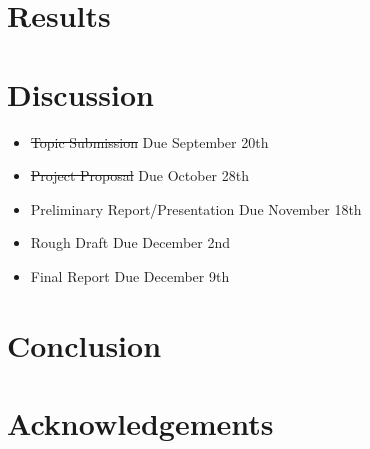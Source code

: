 \documentclass[letterpaper, 10pt, titlepage, twocolumn]{article}
\begin{document}
\section*{Results}


\section*{Discussion}
\begin{itemize}
  \item \normalsize \st{Topic Submission} \footnotesize Due September 20th
  \item \normalsize \st{Project Proposal} \footnotesize Due October 28th
  \item \normalsize Preliminary Report/Presentation \footnotesize Due November 18th
  \item \normalsize Rough Draft \footnotesize Due December 2nd
  \item \normalsize Final Report \footnotesize Due December 9th
\end{itemize}

\section*{Conclusion}

\section*{Acknowledgements}

\printbibliography

\end{document}
